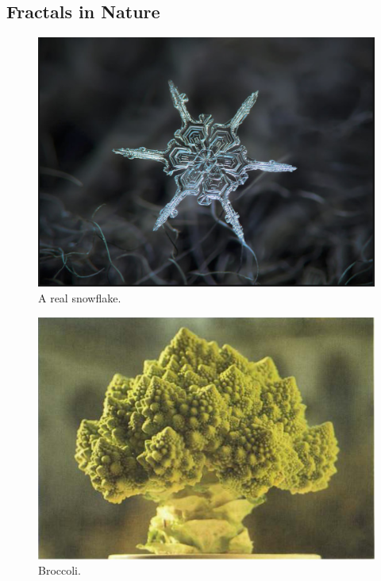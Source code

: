 \subsection{Fractals in Nature}
\begin{figure}[h!]
  \includegraphics[width=\linewidth]{Pictures/real_snowflake.png}
  \caption{A real snowflake.}
  \label{fig:real_snowflake}
\end{figure}
\begin{figure}[h!]
  \includegraphics[width=\linewidth]{Pictures/broccoli.png}
  \caption{Broccoli.}
  \label{fig:broccoli}
\end{figure}
